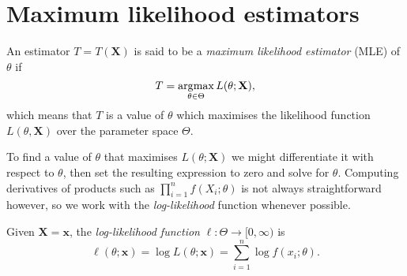 
\section{Maximum likelihood estimators}\label{sec:mle}

\begin{definition}
An estimator $T = T(\mathbf{X})$ is said to be a \emph{maximum likelihood estimator} (MLE) of $\theta$ if
\[
T = \operatorname*{\arg\!\max}_{\theta\in\Theta} L(\theta;\mathbf{X}),
\]
which means that $T$ is a value of $\theta$ which maximises the likelihood function $L(\theta,\mathbf{X})$ over the parameter space $\Theta$.
%
\end{definition}

%
To find a value of $\theta$ that maximises $L(\theta;\mathbf{X})$ we might differentiate it with respect to $\theta$, then set the resulting expression to zero and solve for $\theta$. Computing derivatives of products such as $\prod_{i=1}^n f(X_i;\theta)$ is not always straightforward however, so we work with the \emph{log-likelihood} function whenever possible.

\begin{definition}
Given $\mathbf{X}=\mathbf{x}$, the \emph{log-likelihood function} $\ell:\Theta\to [0,\infty)$ is
\[
\ell(\theta;\mathbf{x}) = \log L(\theta;\mathbf{x}) = \displaystyle\sum_{i=1}^n \log f(x_i;\theta).%
\]
\end{definition}
%
%

